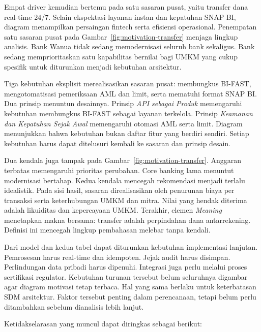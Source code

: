 Empat driver kemudian bertemu pada satu sasaran pusat, yaitu transfer dana
real-time 24/7. Selain ekspektasi layanan instan dan kepatuhan SNAP BI, diagram
menampilkan persaingan fintech serta efisiensi operasional. Penempatan satu
sasaran pusat pada Gambar~\ref{fig:motivation-transfer} menjaga lingkup analisis.
Bank Wanua tidak sedang memodernisasi seluruh bank sekaligus. Bank sedang
memprioritaskan satu kapabilitas bernilai bagi UMKM yang cukup spesifik untuk
diturunkan menjadi kebutuhan arsitektur.

Tiga kebutuhan eksplisit merealisasikan sasaran pusat: membungkus BI-FAST,
mengotomatisasi pemeriksaan AML dan limit, serta mematuhi format SNAP BI. Dua
prinsip menuntun desainnya. Prinsip \emph{API sebagai Produk} memengaruhi
kebutuhan membungkus BI-FAST sebagai layanan terkelola. Prinsip \emph{Keamanan
dan Kepatuhan Sejak Awal} memengaruhi otomasi AML serta limit. Diagram
menunjukkan bahwa kebutuhan bukan daftar fitur yang berdiri sendiri. Setiap
kebutuhan harus dapat ditelusuri kembali ke sasaran dan prinsip desain.

Dua kendala juga tampak pada Gambar~\ref{fig:motivation-transfer}. Anggaran
terbatas memengaruhi prioritas perubahan. Core banking lama menuntut modernisasi
bertahap. Kedua kendala mencegah rekomendasi menjadi terlalu idealistik. Pada
sisi hasil, sasaran direalisasikan oleh penurunan biaya per transaksi serta
keterhubungan UMKM dan mitra. Nilai yang hendak diterima adalah likuiditas dan
kepercayaan UMKM. Terakhir, elemen \emph{Meaning} menetapkan makna bersama:
transfer adalah perpindahan dana antarrekening. Definisi ini mencegah lingkup
pembahasan melebar tanpa kendali.

Dari model dan kedua tabel dapat diturunkan kebutuhan implementasi lanjutan.
Pemrosesan harus real-time dan idempoten. Jejak audit harus disimpan.
Perlindungan data pribadi harus dipenuhi. Integrasi juga perlu melalui proses
sertifikasi regulator. Kebutuhan turunan tersebut belum seluruhnya digambar
agar diagram motivasi tetap terbaca. Hal yang sama berlaku untuk keterbatasan
SDM arsitektur. Faktor tersebut penting dalam perencanaan, tetapi belum perlu
ditambahkan sebelum dianalisis lebih lanjut.

Ketidakselarasan yang muncul dapat diringkas sebagai berikut:

